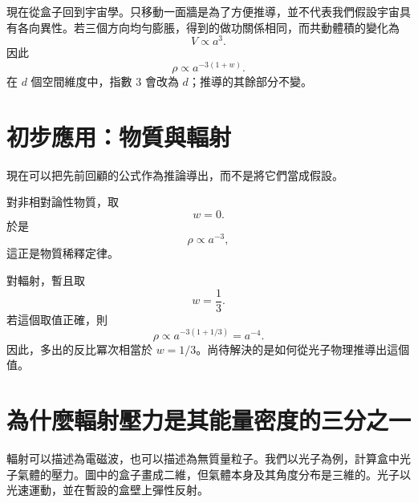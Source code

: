 現在從盒子回到宇宙學。只移動一面牆是為了方便推導，並不代表我們假設宇宙具有各向異性。若三個方向均勻膨脹，得到的做功關係相同，而共動體積的變化為
\begin{equation}
V\propto a^3.
\end{equation}
因此
\begin{equation}
\boxed{\rho\propto a^{-3(1+w)}}.
\label{eq:c05-density-scaling}
\end{equation}
在 \(d\) 個空間維度中，指數 \(3\) 會改為 \(d\)；推導的其餘部分不變。

\section{初步應用：物質與輻射}

現在可以把先前回顧的公式作為推論導出，而不是將它們當成假設。

對非相對論性物質，取
\begin{equation}
w=0.
\end{equation}
於是
\begin{equation}
\rho\propto a^{-3},
\end{equation}
這正是物質稀釋定律。

對輻射，暫且取
\begin{equation}
w=\frac13.
\end{equation}
若這個取值正確，則
\begin{equation}
\rho\propto a^{-3(1+1/3)}=a^{-4}.
\end{equation}
因此，多出的反比冪次相當於 \(w=1/3\)。尚待解決的是如何從光子物理推導出這個值。

\section{為什麼輻射壓力是其能量密度的三分之一}

輻射可以描述為電磁波，也可以描述為無質量粒子。我們以光子為例，計算盒中光子氣體的壓力。圖中的盒子畫成二維，但氣體本身及其角度分布是三維的。光子以光速運動，並在暫設的盒壁上彈性反射。

